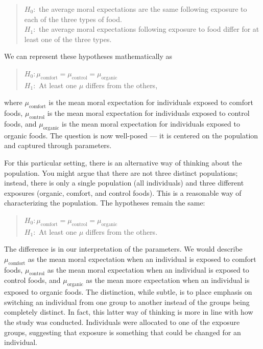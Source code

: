 \documentclass[
  letterpaper,
  DIV=11,
  numbers=noendperiod]{scrreprt}
\theoremstyle{definition}
\theoremstyle{definition}
\theoremstyle{plain}
\theoremstyle{remark}
\begin{document}
\begin{quote}
\(H_0:\) the average moral expectations are the same following exposure
to each of the three types of food.\\
\(H_1:\) the average moral expectations following exposure to food
differ for at least one of the three types.
\end{quote}

We can represent these hypotheses mathematically as

\begin{quote}
\(H_0: \mu_{\text{comfort}} = \mu_{\text{control}} = \mu_{\text{organic}}\)\\
\(H_1:\) At least one \(\mu\) differs from the others,
\end{quote}

where \(\mu_{\text{comfort}}\) is the mean moral expectation for
individuals exposed to comfort foods, \(\mu_{\text{control}}\) is the
mean moral expectation for individuals exposed to control foods, and
\(\mu_{\text{organic}}\) is the mean moral expectation for individuals
exposed to organic foods. The question is now well-posed --- it is
centered on the population and captured through parameters.

For this particular setting, there is an alternative way of thinking
about the population. You might argue that there are not three distinct
populations; instead, there is only a single population (all
individuals) and three different exposures (organic, comfort, and
control foods). This is a reasonable way of characterizing the
population. The hypotheses remain the same:

\begin{quote}
\(H_0: \mu_{\text{comfort}} = \mu_{\text{control}} = \mu_{\text{organic}}\)\\
\(H_1:\) At least one \(\mu\) differs from the others.
\end{quote}

The difference is in our interpretation of the parameters. We would
describe \(\mu_{\text{comfort}}\) as the mean moral expectation when an
individual is exposed to comfort foods, \(\mu_{\text{control}}\) as the
mean moral expectation when an individual is exposed to control foods,
and \(\mu_{\text{organic}}\) as the mean more expectation when an
individual is exposed to organic foods. The distinction, while subtle,
is to place emphasis on switching an individual from one group to
another instead of the groups being completely distinct. In fact, this
latter way of thinking is more in line with how the study was conducted.
Individuals were allocated to one of the exposure groups, suggesting
that exposure is something that could be changed for an individual.
\end{document}

